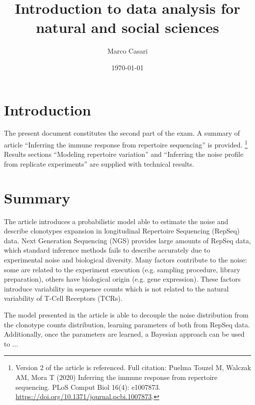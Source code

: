 \documentclass[a4paper,twocolumn]{article}
\title{Introduction to data analysis for natural and social sciences}
\author{Marco Casari}
\date{\today}
\begin{document}
\maketitle

\section{Introduction}
The present document constitutes the second part of the exam. A summary of article ``Inferring the immune response from repertoire sequencing'' is provided.%
\footnote{Version 2 of the article is referenced. Full citation: Puelma Touzel M, Walczak AM, Mora T (2020) Inferring the immune response from repertoire sequencing. PLoS Comput Biol 16(4): e1007873. \url{https://doi.org/10.1371/journal.pcbi.1007873}.}
Results sections ``Modeling repertoire variation'' and ``Inferring the noise profile from replicate experiments'' are supplied with technical results.



\section{Summary}
The article introduces a probabilistic model able to estimate the noise and describe clonotypes expansion in longitudinal Repertoire Sequencing (RepSeq) data.
Next Generation Sequencing (NGS) provides large amounts of RepSeq data, which standard inference methods fails to describe accurately due to experimental noise and biological diversity. Many factors contribute to the noise: some are related to the experiment execution (e.g. sampling procedure, library preparation), others have biological origin (e.g. gene expression). These factors introduce variability in sequence counts which is not related to the natural variability of T-Cell Receptors (TCRs).

The model presented in the article is able to decouple the noise distribution from the clonotype counts distribution, learning parameters of both from RepSeq data. Additionally, once the parameters are learned, a Bayesian approach can be used to ...
\end{document}

